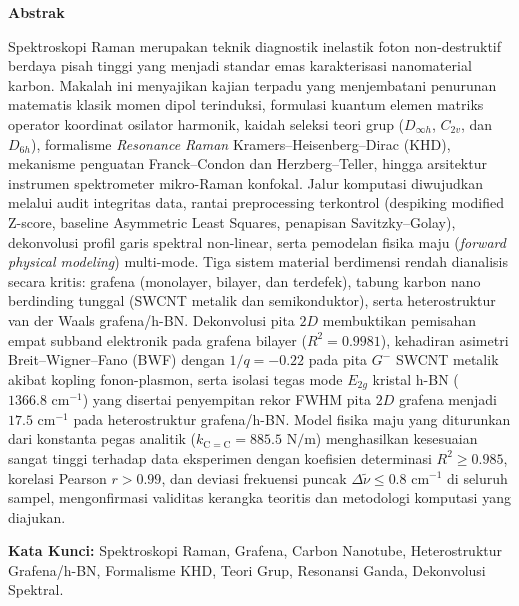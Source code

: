 \documentclass[10pt,a4paper]{article}
\begin{document}
{\fontsize{9pt}{11.5pt}\selectfont
\begin{center}
    \textbf{Abstrak}
\end{center}
\vspace{-0.25cm}
\noindent
Spektroskopi Raman merupakan teknik diagnostik inelastik foton non-destruktif berdaya pisah tinggi yang menjadi standar emas karakterisasi nanomaterial karbon. Makalah ini menyajikan kajian terpadu yang menjembatani penurunan matematis klasik momen dipol terinduksi, formulasi kuantum elemen matriks operator koordinat osilator harmonik, kaidah seleksi teori grup ($D_{\infty h}$, $C_{2v}$, dan $D_{6h}$), formalisme \textit{Resonance Raman} Kramers--Heisenberg--Dirac (KHD), mekanisme penguatan Franck--Condon dan Herzberg--Teller, hingga arsitektur instrumen spektrometer mikro-Raman konfokal. Jalur komputasi diwujudkan melalui audit integritas data, rantai preprocessing terkontrol (despiking modified Z-score, baseline Asymmetric Least Squares, penapisan Savitzky--Golay), dekonvolusi profil garis spektral non-linear, serta pemodelan fisika maju (\textit{forward physical modeling}) multi-mode. Tiga sistem material berdimensi rendah dianalisis secara kritis: grafena (monolayer, bilayer, dan terdefek), tabung karbon nano berdinding tunggal (SWCNT metalik dan semikonduktor), serta heterostruktur van der Waals grafena/h-BN. Dekonvolusi pita $2D$ membuktikan pemisahan empat subband elektronik pada grafena bilayer ($R^2 = 0.9981$), kehadiran asimetri Breit--Wigner--Fano (BWF) dengan $1/q = -0.22$ pada pita $G^-$ SWCNT metalik akibat kopling fonon-plasmon, serta isolasi tegas mode $E_{2g}$ kristal h-BN ($1366.8\text{ cm}^{-1}$) yang disertai penyempitan rekor FWHM pita $2D$ grafena menjadi $17.5\text{ cm}^{-1}$ pada heterostruktur grafena/h-BN. Model fisika maju yang diturunkan dari konstanta pegas analitik ($k_{\mathrm{C=C}} = 885.5\text{ N/m}$) menghasilkan kesesuaian sangat tinggi terhadap data eksperimen dengan koefisien determinasi $R^2 \ge 0.985$, korelasi Pearson $r > 0.99$, dan deviasi frekuensi puncak $\Delta\tilde{\nu} \le 0.8\text{ cm}^{-1}$ di seluruh sampel, mengonfirmasi validitas kerangka teoritis dan metodologi komputasi yang diajukan.

\vspace{0.15cm}
\noindent \textbf{Kata Kunci:} Spektroskopi Raman, Grafena, Carbon Nanotube, Heterostruktur Grafena/h-BN, Formalisme KHD, Teori Grup, Resonansi Ganda, Dekonvolusi Spektral.

\vspace{0.25cm}

}
\end{document}
